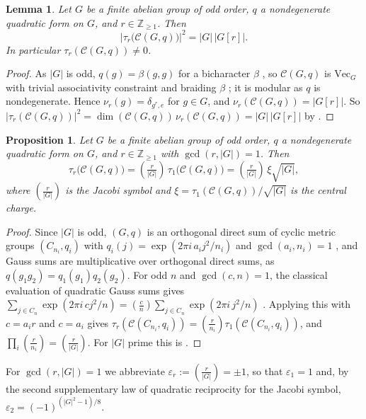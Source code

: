 \documentclass[10pt]{article}
\theoremstyle{plain}
\newtheorem{proposition}[theorem]{Proposition}
\newtheorem{lemma}[theorem]{Lemma}
\theoremstyle{definition}
\theoremstyle{plain}
\newcommand{\Jac}[2]{\left(\tfrac{#1}{#2}\right)}
\begin{document}
\begin{lemma}\label{lem:taun}
Let $G$ be a finite abelian group of odd order, $q$ a nondegenerate quadratic
form on $G$, and $r\in\mathbb{Z}_{\geq1}$. Then
\[
  \bigl|\tau_r\bigl(\mathcal{C}(G,q)\bigr)\bigr|^2=|G|\,|G[r]|.
\]
In particular $\tau_r(\mathcal{C}(G,q))\neq0$.
\end{lemma}

\begin{proof}
As $|G|$ is odd, $q(g)=\beta(g,g)$ for a bicharacter $\beta$ \cite[Lemma A.1]{MR2609644}, so $\mathcal{C}(G,q)$ is $\mathrm{Vec}_G$ with trivial associativity constraint and braiding $\beta$ \cite[Proposition 2.41]{MR2609644}; it is modular as $q$ is nondegenerate. Hence $\nu_r(g)=\delta_{g^r,e}$ for $g\in G$, and $\nu_r(\mathcal{C}(G,q))=|G[r]|$. So $|\tau_r(\mathcal{C}(G,q))|^2=\dim(\mathcal{C}(G,q))\,\nu_r(\mathcal{C}(G,q))=|G|\,|G[r]|$ by \cite[Proposition 3.3]{MR3997136}.
\end{proof}

\begin{proposition}\label{prop:jacobi}
Let $G$ be a finite abelian group of odd order, $q$ a nondegenerate quadratic
form on $G$, and $r\in\mathbb{Z}_{\geq1}$ with $\gcd(r,|G|)=1$.  Then
\begin{equation}\label{eq:jacobi}
  \tau_r\bigl(\mathcal{C}(G,q)\bigr)=\Jac{r}{|G|}\,\tau_1\bigl(\mathcal{C}(G,q)\bigr)
  =\Jac{r}{|G|}\,\xi\sqrt{|G|},
\end{equation}
where $\Jac{r}{|G|}$ is the Jacobi symbol and $\xi=\tau_1(\mathcal{C}(G,q))/\sqrt{|G|}$ is the central charge.
\end{proposition}

\begin{proof}
Since $|G|$ is odd, $(G,q)$ is an orthogonal direct sum of cyclic metric groups $(C_{n_i},q_i)$ with $q_i(j)=\exp(2\pi i\,a_ij^2/n_i)$ and $\gcd(a_i,n_i)=1$ \cite[Section 5, Theorem 4, and Section 6]{MR156890}, and Gauss sums are multiplicative over orthogonal direct sums, as $q(g_1g_2)=q_1(g_1)q_2(g_2)$. For odd $n$ and $\gcd(c,n)=1$, the classical evaluation of quadratic Gauss sums gives $\sum_{j\in C_n}\exp(2\pi i\,cj^2/n)=\Jac{c}{n}\sum_{j\in C_n}\exp(2\pi i\,j^2/n)$ \cite[Chapter 1]{MR1625181}. Applying this with $c=a_ir$ and $c=a_i$ gives $\tau_r(\mathcal{C}(C_{n_i},q_i))=\Jac{r}{n_i}\tau_1(\mathcal{C}(C_{n_i},q_i))$, and $\prod_i\Jac{r}{n_i}=\Jac{r}{|G|}$. For $|G|$ prime this is \cite[Example 3.15]{MR3997136}.
\end{proof}

For $\gcd(r,|G|)=1$ we abbreviate
$\varepsilon_r:=\Jac{r}{|G|}=\pm1$, so that $\varepsilon_1=1$ and, by the second supplementary law of quadratic reciprocity for the Jacobi symbol, $\varepsilon_2=(-1)^{(|G|^2-1)/8}$.
\end{document}
